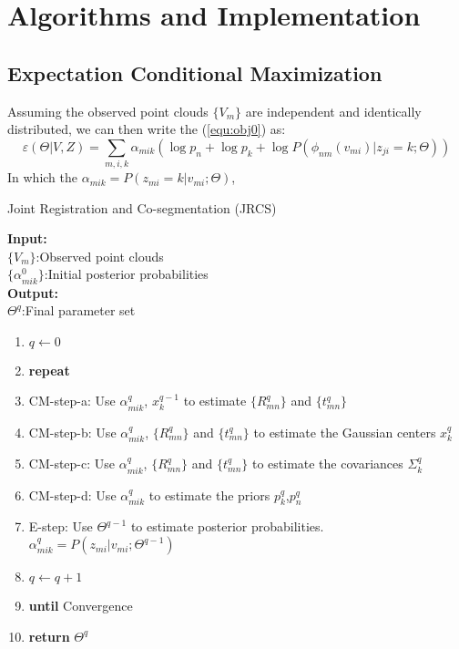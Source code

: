 \section{Algorithms and Implementation}
\label{sec:imp}
\subsection{Expectation Conditional Maximization}
Assuming the observed point clouds $\{V_m\}$ are independent and identically distributed, we can then write the (\ref{equ:obj0}) as: 
\begin{equation}
\label{equ:obj1}
\varepsilon(\Theta|V,Z) =\sum_{m,i,k}\alpha_{mik}(\log p_n + \log p_k +\log P(\phi_{nm}(v_{mi})|z_{ji}=k;\Theta))
\end{equation}
In which the $\alpha_{mik}=P(z_{mi}=k|v_{mi};\Theta)$,
\begin{algorithm}[htb]
	\caption{Joint Registration and Co-segmentation (JRCS)}
	\label{alg:jrcs}
	\textbf{Input:}~~\\
	$\{V_m\}$:Observed point clouds\\
	$\{\alpha_{mik}^0\}$:Initial posterior probabilities~~\\
	\textbf{Output:}~~\\
	$\Theta^q$:Final parameter set~~
	\begin{enumerate}
		\item $q\leftarrow0$
		\item \textbf{repeat}
		\item CM-step-a: Use $\alpha^q_{mik}$, $x^{q-1}_k$ to estimate $\{R_{mn}^q\}$ and $\{t_{mn}^q\}$
		\item CM-step-b: Use $\alpha^q_{mik}$, $\{R_{mn}^q\}$ and $\{t_{mn}^q\}$ to estimate the Gaussian centers $x_k^q$
		\item CM-step-c: Use $\alpha^q_{mik}$, $\{R_{mn}^q\}$ and $\{t_{mn}^q\}$ to estimate the covariances $\Sigma_k^q$
		\item CM-step-d: Use $\alpha^q_{mik}$ to estimate the priors $p_k^q$,$p_n^q$
		\item E-step: Use $\Theta^{q-1}$ to estimate posterior probabilities. $\alpha^q_{mik}=P(z_{mi}|v_{mi};\Theta^{q-1})$
		\item $q \leftarrow q+1$
		\item \textbf{until} Convergence
		\item \textbf{return} $\Theta^q$
	\end{enumerate}
\end{algorithm}
